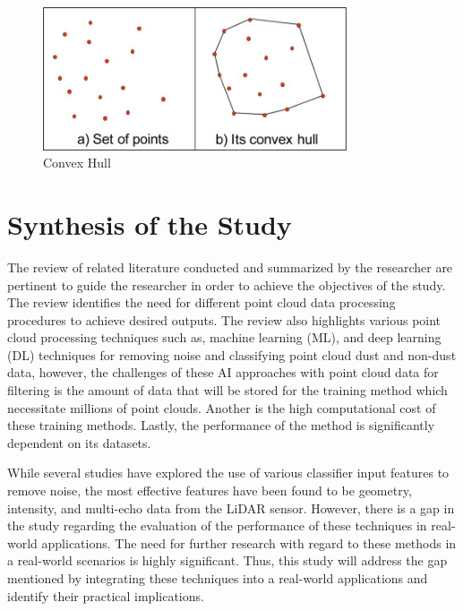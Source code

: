 \begin{figure}[H]
	\centering
	\includegraphics[width=0.8\textwidth]{Figures/convex hull.jpg}
	\caption{Convex Hull}
	\label{fig:convex hull}
\end{figure}

\section{Synthesis of the Study}

The review of related literature conducted and summarized by the researcher are pertinent to guide the researcher in order to achieve the objectives of the study. The review identifies the need for different point cloud data processing procedures to achieve desired outputs. The review also highlights various point cloud processing techniques such as, machine learning (ML), and deep learning (DL) techniques for removing noise and classifying point cloud dust and non-dust data, however, the challenges of these AI approaches with point cloud data for filtering is the amount of data that will be stored for the training method which necessitate millions of point clouds. Another is the high computational cost of these training methods. Lastly, the performance of the method is significantly dependent on its datasets.

While several studies have explored the use of various classifier input features to remove noise, the most effective features have been found to be geometry, intensity, and multi-echo data from the LiDAR sensor. However, there is a gap in the study regarding the evaluation of the performance of these techniques in real-world applications. The need for further research with regard to these methods in a real-world scenarios is highly significant. Thus, this study will address the gap mentioned by integrating these techniques into a real-world applications and identify their practical implications.